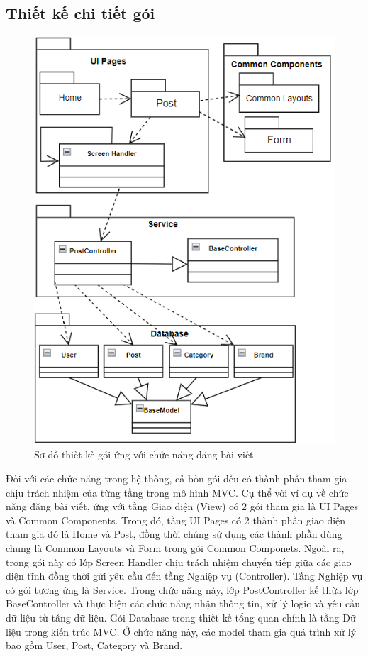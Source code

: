 \documentclass[../DoAn.tex]{subfiles}
\begin{document}
\subsection{Thiết kế chi tiết gói}
\begin{figure}[H]
    \centering
    \includegraphics[width=0.9\linewidth]{Hinhve/package-detail.png}
    \caption{Sơ đồ thiết kế gói ứng với chức năng đăng bài viết}
    \label{fig:Fig1}
\end{figure}
Đối với các chức năng trong hệ thống, cả bốn gói đều có thành phần tham gia chịu trách nhiệm của từng tầng trong mô hình MVC. Cụ thể với ví dụ về chức năng đăng bài viết, ứng với tầng Giao diện (View) có 2 gói tham gia là UI Pages và Common Components. Trong đó, tầng UI Pages có 2 thành phần giao diện tham gia đó là Home và Post, đồng thời chúng sử dụng các thành phần dùng chung là Common Layouts và Form trong gói Common Componets. Ngoài ra, trong gói này có lớp Screen Handler chịu trách nhiệm chuyển tiếp giữa các giao diện tĩnh đồng thời gửi yêu cầu đến tầng Nghiệp vụ (Controller). Tầng Nghiệp vụ có gói tương ứng là Service. Trong chức năng này, lớp PostController kế thừa lớp BaseController và thực hiện các chức năng nhận thông tin, xử lý logic và yêu cầu dữ liệu từ tầng dữ liệu. Gói Database trong thiết kế tổng quan chính là tầng Dữ liệu trong kiến trúc MVC. Ở chức năng này, các model tham gia quá trình xử lý bao gồm User, Post, Category và Brand.
\end{document}
